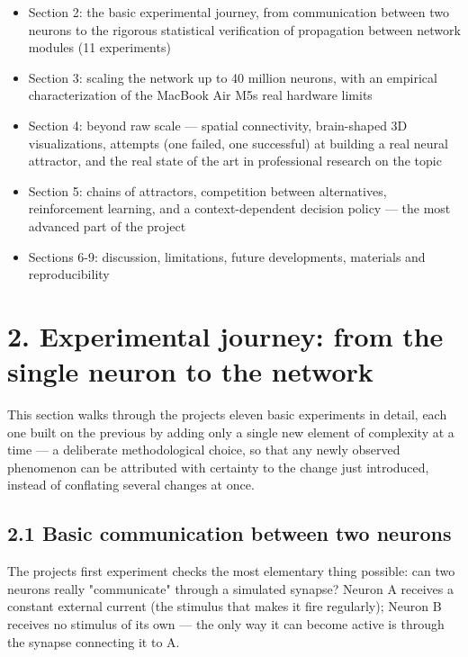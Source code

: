 \documentclass[
  english,
]{article}
\begin{document}
\begin{itemize}
\item
  Section 2: the basic experimental journey, from communication between two neurons to the rigorous statistical verification of propagation between network modules (11 experiments)
\item
  Section 3: scaling the network up to 40 million neurons, with an empirical characterization of the MacBook Air M5\textquotesingle s real hardware limits
\item
  Section 4: beyond raw scale --- spatial connectivity, brain-shaped 3D visualizations, attempts (one failed, one successful) at building a real neural attractor, and the real state of the art in professional research on the topic
\item
  Section 5: chains of attractors, competition between alternatives, reinforcement learning, and a context-dependent decision policy --- the most advanced part of the project
\item
  Sections 6-9: discussion, limitations, future developments, materials and reproducibility
\end{itemize}

\section{2. Experimental journey: from the single neuron to the network}\label{experimental-journey-from-the-single-neuron-to-the-network}

This section walks through the project\textquotesingle s eleven basic experiments in detail, each one built on the previous by adding only a single new element of complexity at a time --- a deliberate methodological choice, so that any newly observed phenomenon can be attributed with certainty to the change just introduced, instead of conflating several changes at once.

\subsection{2.1 Basic communication between two neurons}\label{basic-communication-between-two-neurons}

The project\textquotesingle s first experiment checks the most elementary thing possible: can two neurons really "communicate" through a simulated synapse? Neuron A receives a constant external current (the stimulus that makes it fire regularly); Neuron B receives no stimulus of its own --- the only way it can become active is through the synapse connecting it to A.
\end{document}
